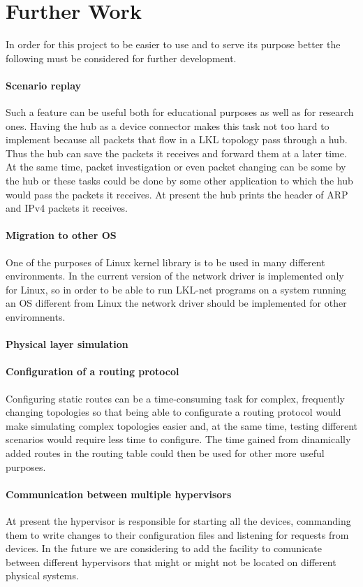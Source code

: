 \chapter{Further Work}
\label{chapter:further}
In order for this project to be easier to use and to serve its purpose better the following must be considered for further development.
\subsubsection{Scenario replay}
\label{sec:scenario-replay}
Such a feature can be useful both for educational purposes as well as for research ones. Having the hub as a device connector makes this task not too hard to implement because all packets that flow in a LKL topology pass through a hub. Thus the hub can save the packets it receives and forward them at a later time. At the same time, packet investigation or even packet changing can be some by the hub or these tasks could be done by some other application to which the hub would pass the packets it receives. At present the hub prints the header of ARP and IPv4 packets it receives.
\subsubsection{Migration to other OS}
\label{sec:migration-os}
One of the purposes of Linux kernel library is to be used in many different environments. In the current version of \project the network driver is implemented only for Linux, so in order to be able to run LKL-net programs on a system running an OS different from Linux the network driver should be implemented for other enviromnents.
\subsubsection{Physical layer simulation}
\label{sec:physica-sim}

\subsubsection{Configuration of a routing protocol}
\label{sec:routing-prot}
Configuring static routes can be a time-consuming task for complex, frequently changing topologies so that being able to configurate a routing protocol would make simulating complex topologies easier and, at the same time, testing different scenarios would require less time to configure. The time gained from dinamically added routes in the routing table could then be used for other more useful purposes.


\subsubsection{Communication between multiple hypervisors}
\label{sec:hypervisor-comm}
At present the hypervisor is responsible for starting all the devices, commanding them to write changes to their configuration files and listening for requests from devices. In the future we are considering to add the facility to comunicate between different hypervisors that might or might not be located on different physical systems. 
